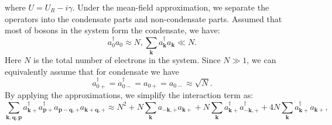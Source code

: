 \documentclass[aps,superscriptaddress,notitlepage,longbibliography]{revtex4-1}
\begin{document}
where $U=U_{R}-i\gamma$. Under the mean-field approximation, we separate
the operators into the condensate parts and non-condensate parts.
Assumed that most of bosons in the system form the condensate, we
have: 
\begin{equation}
a_{0}^{\dagger}a_{0}\approx N,\sum_{\bm{k}}a_{\bm{k}}^{\dagger}a_{\bm{k}}\ll N.
\end{equation}
Here $N$ is the total number of electrons in the system. Since $N\gg1$,
we can equivalently assume that for condensate we have 
\begin{equation}
a_{0+}^{\dagger}=a_{0-}^{\dagger}=a_{0+}=a_{0-}\approx\sqrt{N}.
\end{equation}
By applying the approximations, we simplify the interaction term as:
\begin{equation}
\sum_{\bm{k},\bm{q},\bm{p}}a_{\bm{k}+}^{\dagger}a_{\bm{p}+}^{\dagger}a_{\bm{p}-\bm{q},+}a_{\bm{k}+\bm{q},+}\approx N^{2}+N\sum_{\bm{k}}a_{-\bm{k},+}a_{\bm{k}+}+N\sum_{\bm{k}}a_{\bm{k}+}^{\dagger}a_{-\bm{k},+}^{\dagger}+4N\sum_{\bm{k}}a_{\bm{k}+}^{\dagger}a_{\bm{k}+},\label{mean1}
\end{equation}
\end{document}
